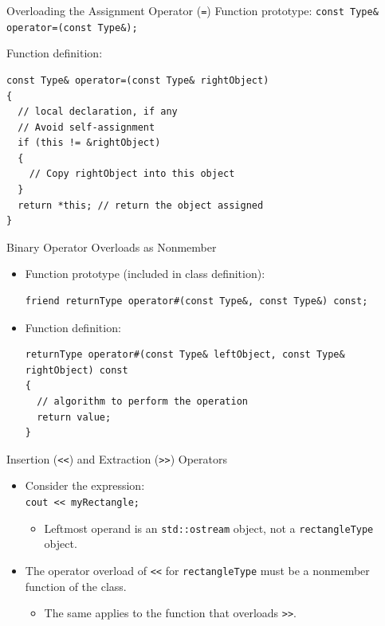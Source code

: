 \documentclass[14pt,aspectratio=1610, hyperref={pdfpagelayout=SinglePage}]{beamer}
\begin{document}
\begin{frame}[fragile]{Overloading the Assignment Operator (\texttt{=})}
\protect\hypertarget{overloading-the-assignment-operator}{}
  Function prototype:
  \lstinline{const Type& operator=(const Type&);}

  Function definition:
  \begin{lstlisting}[basicstyle=\ttfamily\small]
const Type& operator=(const Type& rightObject)
{
  // local declaration, if any
  // Avoid self-assignment
  if (this != &rightObject)
  {
    // Copy rightObject into this object
  }
  return *this; // return the object assigned
}\end{lstlisting}

\end{frame}

\begin{frame}[fragile]{Binary Operator Overloads as Nonmember}
\protect\hypertarget{overloading-the-binary-operators-arithmetic-or-relational-as-nonmember-functions}{}
\begin{itemize}
\item
  Function prototype (included in class definition):
  \begin{lstlisting}
friend returnType operator#(const Type&, const Type&) const;
\end{lstlisting}
\item
  Function definition:
  \begin{lstlisting}[basicstyle=\ttfamily\small]
returnType operator#(const Type& leftObject, const Type& rightObject) const
{
  // algorithm to perform the operation
  return value;
}
\end{lstlisting}
\end{itemize}
\end{frame}

\begin{frame}[fragile]{Insertion
(\texttt{{<}<}) and Extraction (\texttt{{>}>}) Operators}
\begin{itemize}

\item
  Consider the expression:\\
  \lstinline{cout << myRectangle;}

  \begin{itemize}
  \item
    Leftmost operand is an \lstinline{std::ostream} object, not a
    \lstinline{rectangleType} object.
  \end{itemize}
\item
  The operator overload of
  \lstinline{<<} for \lstinline{rectangleType} must be a
  nonmember function of the class.
  \begin{itemize}
  \item
    The same applies to the function that overloads
    \lstinline{>>}.
    \end{itemize}
\end{itemize}
\end{frame}
\end{document}
